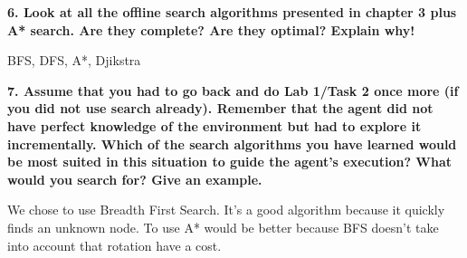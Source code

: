 \documentclass[12pt,a4paper]{article}
\begin{document}
\textbf{6. Look at all the offline search algorithms presented in chapter 3 plus A* search. Are they complete? Are they optimal? Explain why!}

BFS, DFS, A*, Djikstra

\textbf{7. Assume that you had to go back and do Lab 1/Task 2 once more (if you did not use search already). Remember that the agent did not have perfect knowledge of the environment but had to explore it incrementally. Which of the search algorithms you have learned would be most suited in this situation to guide the agent's execution? What would you search for? Give an example.}

We chose to use Breadth First Search. It's a good algorithm because it quickly finds an unknown node. To use A* would be better because BFS doesn't take into account that rotation have a cost.
\end{document}
